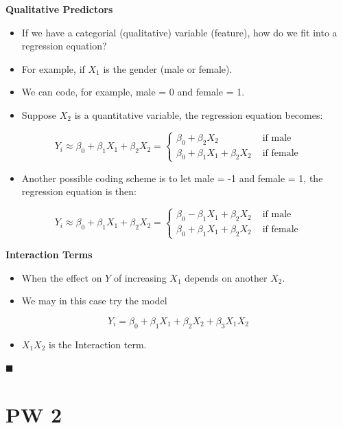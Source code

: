 \documentclass[]{book}
\providecommand{\tightlist}{%
  \setlength{\itemsep}{0pt}\setlength{\parskip}{0pt}}
\begin{document}
\textbf{Qualitative Predictors}

\begin{itemize}
\tightlist
\item
  If we have a categorial (qualitative) variable (feature), how do we
  fit into a regression equation?
\item
  For example, if \(X_1\) is the gender (male or female).
\item
  We can code, for example, male = 0 and female = 1.
\item
  Suppose \(X_2\) is a quantitative variable, the regression equation
  becomes:
\end{itemize}

\[ Y_i \approx \beta_0 + \beta_1 X_1 + \beta_2 X_2 = \begin{cases}
  \beta_0 + \beta_2 X_2 & \text{ if male} \\
  \beta_0 + \beta_1 X_1 + \beta_2 X_2 & \text{ if female}
\end{cases} \]

\begin{itemize}
\tightlist
\item
  Another possible coding scheme is to let male = -1 and female = 1, the
  regression equation is then:
\end{itemize}

\[ Y_i \approx \beta_0 + \beta_1 X_1 + \beta_2 X_2 = \begin{cases}
  \beta_0 -\beta_1 X_1 + \beta_2 X_2 & \text{ if male} \\
  \beta_0 + \beta_1 X_1 + \beta_2 X_2 & \text{ if female}
\end{cases} \]

\textbf{Interaction Terms}

\begin{itemize}
\tightlist
\item
  When the effect on \(Y\) of increasing \(X_1\) depends on another
  \(X_2\).
\item
  We may in this case try the model
\end{itemize}

\[ Y_i = \beta_0 + \beta_1 X_1 + \beta_2 X_2 + \beta_3 X_1 X_2 \]

\begin{itemize}
\tightlist
\item
  \(X_1 X_2\) is the Interaction term.
\end{itemize}

◼

\chapter*{PW 2}\label{pw-2}
\end{document}
